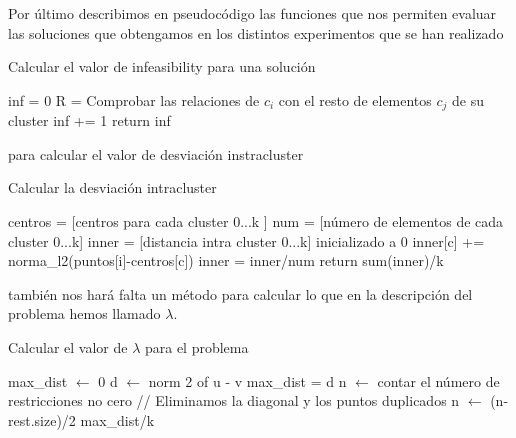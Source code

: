 \documentclass[11pt]{article}
\begin{document}
Por último describimos en pseudocódigo las funciones que nos permiten evaluar
las soluciones que obtengamos en los distintos experimentos que se han realizado

\begin{algorithm}[H]
  \caption{Calcular el valor de infeasibility para una solución}
  \label{alg-inf}
  \begin{algorithmic}[1]
    \State inf = 0
    \State R = Comprobar las relaciones de $c_i$ con el resto de elementos $c_j$ de su cluster
    \State inf += 1
    \EndIf
    \EndFor
    \EndFor
    \State return inf
    \EndProcedure
  \end{algorithmic}
  \end{algorithm}
  
para calcular el valor de desviación instracluster
  
  \begin{algorithm}[H]
  \caption{Calcular la desviación intracluster}
  \label{alg-intra}
  \begin{algorithmic}[1]
    \State centros = [centros para cada cluster 0...k ]
    \State num = [número de elementos de cada cluster 0...k]
    \State inner = [distancia intra cluster 0...k] inicializado a 0
    \State inner[c] += norma\_l2(puntos[i]-centros[c])
    \EndFor
    \State inner = inner/num
    \State return sum(inner)/k
    \EndProcedure
  \end{algorithmic}
  \end{algorithm}
  
  
  también nos hará falta un método para calcular lo que en la
  descripción del problema hemos llamado $\lambda$.
  
  \begin{algorithm}[H]
  \caption{Calcular el valor de $\lambda$ para el problema}
  \label{alg-lambda}
  \begin{algorithmic}[1]
    \State max\_dist $\leftarrow$ 0 
    \State d $\leftarrow$ norm 2 of u - v
    \State max\_dist = d
    \EndIf
    \EndFor
    \EndFor
    \State n $\leftarrow$ contar el número de restricciones no cero
    \State // Eliminamos la diagonal y los puntos duplicados
    \State n $\leftarrow$ (n-rest.size)/2
    \State \Return max\_dist/k
    \EndProcedure
  \end{algorithmic}
  \end{algorithm}
  
\end{document}
